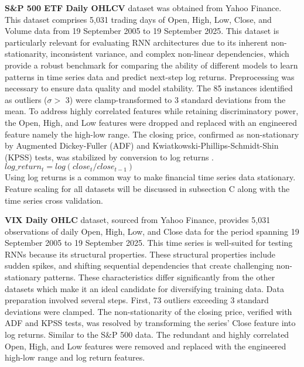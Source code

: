 \documentclass[conference, 10pt]{IEEEtran}
\begin{document}
\textbf{S\&P 500 ETF Daily OHLCV} dataset was obtained from Yahoo Finance. This dataset comprises 5,031 trading days of
Open, High, Low, Close, and Volume data from 19 September 2005 to 19 September 2025. This dataset is particularly
relevant for evaluating RNN architectures due to its inherent non-stationarity, inconsistent variance, and complex
non-linear dependencies, which provide a robust benchmark for comparing the ability of different models to learn
patterns in time series data and predict next-step log returns. Preprocessing was necessary to ensure data quality and
model stability. The 85 instances identified as outliers ($\sigma >$ 3) were clamp-transformed to 3 standard deviations
from the mean. To address highly correlated features while retaining discriminatory power, the Open, High, and Low
features were dropped and replaced with an engineered feature namely the high-low range. The closing price, confirmed as
non-stationary by Augmented Dickey-Fuller (ADF) and Kwiatkowski-Phillips-Schmidt-Shin (KPSS) tests, was stabilized by
conversion to log returns \cite{StationarityTests}. \\

$log\_return_t = log(close_t / close_{t-1})$\\

Using log returns is a common way to make financial time series data stationary. 
Feature scaling for all datasets will be discussed in subsection C along with the time series cross validation.

\textbf{VIX Daily OHLC} dataset, sourced from Yahoo Finance, provides 5,031 observations of daily Open, High, Low, and
Close data for the period spanning 19 September 2005 to 19 September 2025. This time series is well-suited for testing
RNNs because its structural properties. These structural properties include sudden spikes, and shifting sequential
dependencies that create challenging non-stationary patterns. These characteristics differ significantly from the other
datasets which make it an ideal candidate for diversifying training data. Data preparation involved several steps.
First, 73 outliers exceeding 3 standard deviations were clamped. The non-stationarity of the closing price, verified
with ADF and KPSS tests, was resolved by transforming the series' Close feature into log returns. Similar to the S\&P 500 data. The
redundant and highly correlated Open, High, and Low features were removed and replaced with the engineered high-low
range and log return features.
\end{document}
